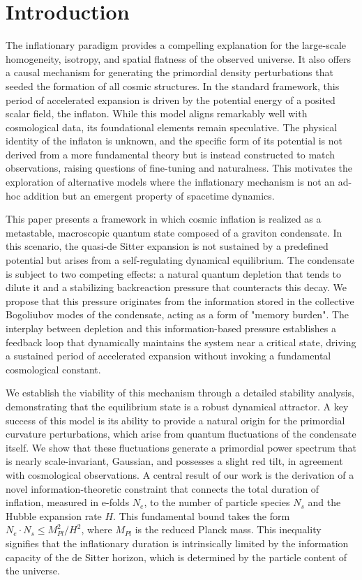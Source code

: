 \documentclass[]{article}
\begin{document}
\section{Introduction}
\label{sec:intro}
The inflationary paradigm provides a compelling explanation for the large-scale homogeneity, isotropy, and spatial flatness of the observed universe. It also offers a causal mechanism for generating the primordial density perturbations that seeded the formation of all cosmic structures. In the standard framework, this period of accelerated expansion is driven by the potential energy of a posited scalar field, the inflaton. While this model aligns remarkably well with cosmological data, its foundational elements remain speculative. The physical identity of the inflaton is unknown, and the specific form of its potential is not derived from a more fundamental theory but is instead constructed to match observations, raising questions of fine-tuning and naturalness. This motivates the exploration of alternative models where the inflationary mechanism is not an ad-hoc addition but an emergent property of spacetime dynamics.

This paper presents a framework in which cosmic inflation is realized as a metastable, macroscopic quantum state composed of a graviton condensate. In this scenario, the quasi-de Sitter expansion is not sustained by a predefined potential but arises from a self-regulating dynamical equilibrium. The condensate is subject to two competing effects: a natural quantum depletion that tends to dilute it and a stabilizing backreaction pressure that counteracts this decay. We propose that this pressure originates from the information stored in the collective Bogoliubov modes of the condensate, acting as a form of "memory burden". The interplay between depletion and this information-based pressure establishes a feedback loop that dynamically maintains the system near a critical state, driving a sustained period of accelerated expansion without invoking a fundamental cosmological constant.

We establish the viability of this mechanism through a detailed stability analysis, demonstrating that the equilibrium state is a robust dynamical attractor. A key success of this model is its ability to provide a natural origin for the primordial curvature perturbations, which arise from quantum fluctuations of the condensate itself. We show that these fluctuations generate a primordial power spectrum that is nearly scale-invariant, Gaussian, and possesses a slight red tilt, in agreement with cosmological observations. A central result of our work is the derivation of a novel information-theoretic constraint that connects the total duration of inflation, measured in e-folds $N_e$, to the number of particle species $N_s$ and the Hubble expansion rate $H$. This fundamental bound takes the form $N_e \cdot N_s \leq M_{Pl}^2/H^2$, where $M_{Pl}$ is the reduced Planck mass. This inequality signifies that the inflationary duration is intrinsically limited by the information capacity of the de Sitter horizon, which is determined by the particle content of the universe.
\end{document}
